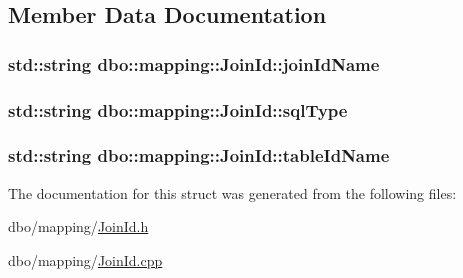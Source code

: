 \subsection{Member Data Documentation}
\hypertarget{structdbo_1_1mapping_1_1_join_id_a7351e903042349c2ea5b3d48c5abbbeb}{
\subsubsection[{join\+Id\+Name}]{\setlength{\rightskip}{0pt plus 5cm}std\+::string dbo\+::mapping\+::\+Join\+Id\+::join\+Id\+Name}}\label{structdbo_1_1mapping_1_1_join_id_a7351e903042349c2ea5b3d48c5abbbeb}
\hypertarget{structdbo_1_1mapping_1_1_join_id_a9b3760ce227416a2959251d327ae2665}{
\subsubsection[{sql\+Type}]{\setlength{\rightskip}{0pt plus 5cm}std\+::string dbo\+::mapping\+::\+Join\+Id\+::sql\+Type}}\label{structdbo_1_1mapping_1_1_join_id_a9b3760ce227416a2959251d327ae2665}
\hypertarget{structdbo_1_1mapping_1_1_join_id_ae975703316fa343d3410793096a1b17b}{
\subsubsection[{table\+Id\+Name}]{\setlength{\rightskip}{0pt plus 5cm}std\+::string dbo\+::mapping\+::\+Join\+Id\+::table\+Id\+Name}}\label{structdbo_1_1mapping_1_1_join_id_ae975703316fa343d3410793096a1b17b}


The documentation for this struct was generated from the following files\+:\begin{DoxyCompactItemize}
\item 
dbo/mapping/\hyperlink{_join_id_8h}{Join\+Id.\+h}\item 
dbo/mapping/\hyperlink{_join_id_8cpp}{Join\+Id.\+cpp}\end{DoxyCompactItemize}
